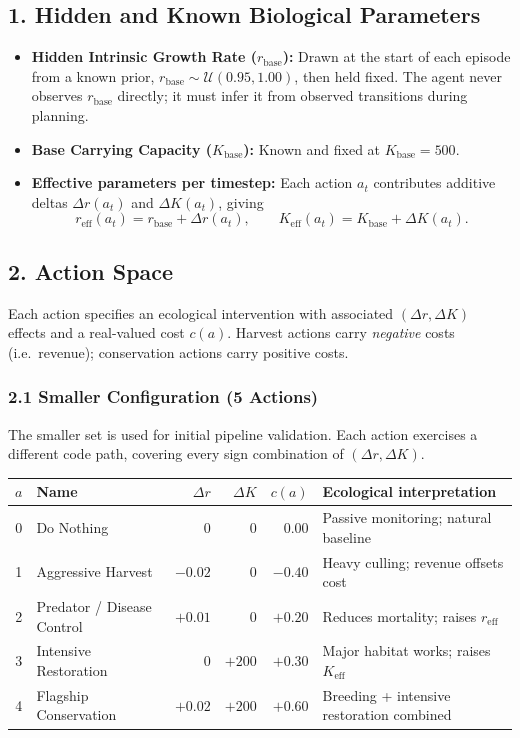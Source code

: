 \documentclass[11pt]{article}
\begin{document}
\subsection*{1. Hidden and Known Biological Parameters}
\begin{itemize}
    \item \textbf{Hidden Intrinsic Growth Rate ($r_{\mathrm{base}}$):} Drawn at the start of each episode from a known prior, $r_{\mathrm{base}} \sim \mathcal{U}(0.95, 1.00)$, then held fixed. The agent never observes $r_{\mathrm{base}}$ directly; it must infer it from observed transitions during planning.
    \item \textbf{Base Carrying Capacity ($K_{\mathrm{base}}$):} Known and fixed at $K_{\mathrm{base}} = 500$.
    \item \textbf{Effective parameters per timestep:} Each action $a_t$ contributes additive deltas $\Delta r(a_t)$ and $\Delta K(a_t)$, giving
    \[
        r_{\mathrm{eff}}(a_t) = r_{\mathrm{base}} + \Delta r(a_t), \qquad K_{\mathrm{eff}}(a_t) = K_{\mathrm{base}} + \Delta K(a_t).
    \]
\end{itemize}

\subsection*{2. Action Space}

Each action specifies an ecological intervention with associated $(\Delta r, \Delta K)$ effects and a real-valued cost $c(a)$. Harvest actions carry \emph{negative} costs (i.e.\ revenue); conservation actions carry positive costs.

\subsubsection*{2.1 Smaller Configuration (5 Actions)}

The smaller set is used for initial pipeline validation. Each action exercises a different code path, covering every sign combination of $(\Delta r, \Delta K)$.

\begin{center}
\begin{tabular}{clrrrl}
\hline
$a$ & Name & $\Delta r$ & $\Delta K$ & $c(a)$ & Ecological interpretation \\
\hline
0 & Do Nothing                  & $0$     & $0$    & $0.00$  & Passive monitoring; natural baseline \\
1 & Aggressive Harvest          & $-0.02$ & $0$    & $-0.40$ & Heavy culling; revenue offsets cost \\
2 & Predator / Disease Control  & $+0.01$ & $0$    & $+0.20$ & Reduces mortality; raises $r_{\mathrm{eff}}$ \\
3 & Intensive Restoration       & $0$     & $+200$ & $+0.30$ & Major habitat works; raises $K_{\mathrm{eff}}$ \\
4 & Flagship Conservation       & $+0.02$ & $+200$ & $+0.60$ & Breeding + intensive restoration combined \\
\hline
\end{tabular}
\end{center}
\end{document}
